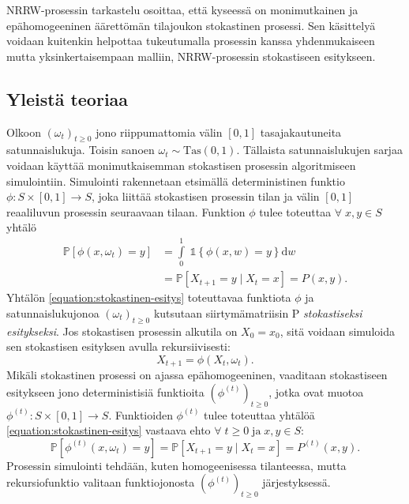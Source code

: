 \documentclass[finnish, 12pt, a4paper, sci, utf8, pdfa]{aaltothesis}
\newcommand{\indicator}{\mathopen{\mathds{1}}}
\newcommand*{\prob}{\mathbb{P}}
\begin{document}
NRRW-prosessin tarkastelu osoittaa, että kyseessä on monimutkainen ja epähomogeeninen äärettömän tilajoukon stokastinen prosessi. Sen käsittelyä voidaan kuitenkin helpottaa tukeutumalla
prosessin kanssa yhdenmukaiseen mutta yksinkertaisempaan malliin, NRRW-prosessin stokastiseen esitykseen.

\subsection{Yleistä teoriaa}

Olkoon \( (\omega_{t})_{t \geq 0} \) jono riippumattomia välin \( [0, 1] \) tasajakautuneita satunnaislukuja. Toisin sanoen \( \omega_{t} \sim \text{Tas}(0, 1) \). Tällaista satunnaislukujen sarjaa voidaan käyttää monimutkaisemman stokastisen prosessin algoritmiseen simulointiin. Simulointi rakennetaan etsimällä deterministinen funktio \( \phi : S \times [0, 1] \to S \), joka liittää stokastisen prosessin tilan ja välin \( [0, 1] \) reaaliluvun prosessin seuraavaan tilaan. Funktion \( \phi \) tulee toteuttaa $ \forall \; x, y \in S $ yhtälö
\begin{equation}
   \begin{aligned}
   \prob \left[ \phi(x, \omega_{t}) = y \right] &= \int\limits_0^1 \; \indicator \left\{ \phi(x, w) = y \right\} \mathrm{d}w \\
                                                &= \prob \left[ X_{t+1} = y \mid X_{t} = x \right] = P(x, y).
   \end{aligned}
   \label{equation:stokastinen-esitys}
\end{equation}
Yhtälön \ref{equation:stokastinen-esitys} toteuttavaa funktiota \( \phi \) ja satunnaislukujonoa \( (\omega_{t})_{t \geq 0} \) kutsutaan siirtymämatriisin P \textit{stokastiseksi esitykseksi}. Jos stokastisen prosessin alkutila on \( X_{0} = x_{0} \), sitä voidaan simuloida sen stokastisen esityksen avulla rekursiivisesti:
\[
   X_{t+1} = \phi(X_{t}, \omega_{t}).
\]
Mikäli stokastinen prosessi on ajassa epähomogeeninen, vaaditaan stokastiseen esitykseen jono deterministisiä funktioita \( (\phi^{(t)})_{t \geq 0} \), jotka ovat muotoa \( \phi^{(t)} : S \times [0, 1] \to S \). Funktioiden \( \phi^{(t)} \) tulee toteuttaa yhtälöä \ref{equation:stokastinen-esitys} vastaava ehto \( \forall \; t \geq 0 \; \text{ja} \; x, y \in S \):
\begin{equation}
   \prob \left[ \phi^{(t)}(x, \omega_{t}) = y \right] = \prob \left[ X_{t+1} = y \mid X_{t} = x \right] = P^{(t)}(x,y).
   \label{equation:epahom-stokastinen-esitys}
\end{equation}
Prosessin simulointi tehdään, kuten homogeenisessa tilanteessa, mutta rekursiofunktio valitaan funktiojonosta \( (\phi^{(t)})_{t \geq 0} \) järjestyksessä. \cite{Haggstrom}
\end{document}
